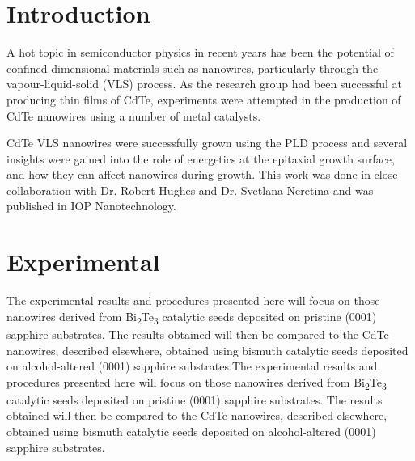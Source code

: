 \section{Introduction} \label{sec:cdtenanowires}
A hot topic in semiconductor physics in recent years has been the potential of confined dimensional materials such as nanowires, particularly through the vapour-liquid-solid (VLS) process.
As the research group had been successful at producing thin films of CdTe, experiments were attempted in the production of CdTe nanowires using a number of metal catalysts.

CdTe VLS nanowires were successfully grown using the PLD process and several insights were gained into the role of energetics at the epitaxial growth surface, and how they can affect nanowires during growth.
This work was done in close collaboration with Dr.
Robert Hughes and Dr.
Svetlana Neretina and was published in IOP Nanotechnology\cite{Neretina2008b}.

\section{Experimental}
The experimental results and procedures presented here will focus on those nanowires derived from Bi\textsubscript{2}Te\textsubscript{3} catalytic seeds deposited on pristine (0001) sapphire substrates.
The results obtained will then be compared to the CdTe nanowires, described elsewhere\cite{Neretina2007b}, obtained using bismuth catalytic seeds deposited on alcohol-altered (0001) sapphire substrates.The experimental results and procedures presented here will focus on those nanowires derived from Bi\textsubscript{2}Te\textsubscript{3} catalytic seeds deposited on pristine (0001) sapphire substrates.
The results obtained will then be compared to the CdTe nanowires, described elsewhere\cite{Neretina2007b}, obtained using bismuth catalytic seeds deposited on alcohol-altered (0001) sapphire substrates.

